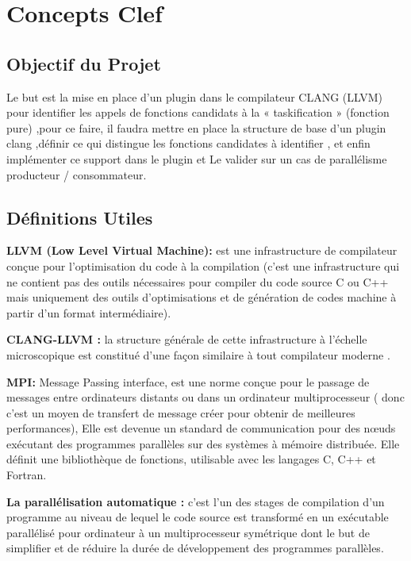 \documentclass[12pt,titlepage]{article}
\begin{document}
\section{Concepts Clef}

\subsection{Objectif du Projet}

Le but est la mise en place d’un plugin dans le compilateur CLANG (LLVM) pour identifier les appels de fonctions candidats à la « taskification » (fonction pure) ,pour ce faire, il faudra mettre en place la structure de base d’un plugin clang ,définir ce qui distingue les fonctions candidates à identifier , et enfin implémenter ce support dans le plugin et  Le valider sur un cas de parallélisme producteur / consommateur.

\subsection{Définitions Utiles} 
	
\textbf{ LLVM (Low Level Virtual Machine):} est une infrastructure de compilateur conçue pour l'optimisation du code à la compilation (c’est une infrastructure qui ne contient pas des outils nécessaires pour compiler du code source C ou C++ mais uniquement des outils d’optimisations et de génération de codes machine à partir d’un format intermédiaire).\cite{clangllvm}
              
\textbf{CLANG-LLVM :} la structure générale de cette infrastructure à l’échelle microscopique est constitué d’une façon similaire à tout compilateur moderne .\cite{clangllvm}


\textbf{ MPI:} Message Passing interface, est une norme conçue pour le passage de messages entre ordinateurs distants ou dans un ordinateur multiprocesseur ( donc c’est un moyen de transfert de message créer pour obtenir de meilleures performances), Elle est devenue un standard de communication pour des nœuds exécutant des programmes parallèles sur des systèmes à mémoire distribuée. Elle définit une bibliothèque de fonctions, utilisable avec les langages C, C++ et Fortran.\cite{wiki}


\textbf{ La parallélisation automatique :} c’est l’un des stages de compilation d’un programme au niveau de lequel le code source est transformé  en un exécutable parallélisé pour ordinateur à un multiprocesseur symétrique dont le but de simplifier et de réduire la durée de développement des programmes parallèles.\cite{wiki}
\end{document}
